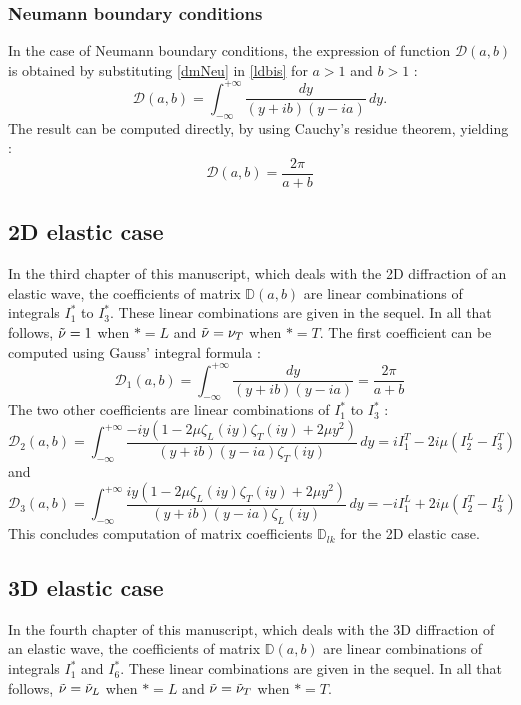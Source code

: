 \subsubsection{Neumann boundary conditions}
\label{finalDacNeu}
In the case of Neumann boundary conditions, the expression of function $\mathcal{D}(a,b)$ is obtained by substituting \eqref{dmNeu} in \eqref{ldbis} for $a>1$ and $b>1$ :
\begin{equation}
\mathcal{D}(a,b) = \int_{-\infty}^{+\infty} \dfrac{dy}{ (y+ib)(y-ia)} \, dy .
\end{equation}
The result can be computed directly, by using Cauchy's residue theorem, yielding :
\begin{equation}
\mathcal{D}(a,b)=\dfrac{2\pi}{a+b}
\end{equation}

\subsection{2D elastic case}
In the third chapter of this manuscript, which deals with the 2D diffraction of an elastic wave, the coefficients of matrix $\mathbb{D}(a,b)$ are linear combinations of integrals $I_1^*$ to $I_3^*$. These linear combinations are given in the sequel. In all that follows, $\tilde{\nu}=1$ when $*=L$ and $\tilde{\nu}=\nu_T$ when $*=T$.
\label{finalD2D}
The first coefficient can be computed using Gauss' integral formula :
\begin{equation}
\mathcal{D}_1(a,b)=\int_{-\infty}^{+\infty} \frac{dy}{(y+ib)(y-ia)}=\frac{2\pi}{a+b}
\end{equation}
The two other coefficients are linear combinations of $I_1^*$ to $I_3^*$ :
\begin{equation}
\mathcal{D}_2(a,b)=\int_{-\infty}^{+\infty} \frac{-iy(1-2\mu \zeta_L(iy) \zeta_T(iy)+2\mu y^2)}{(y+ib)(y-ia)\zeta_T(iy)} \,dy =i I_1^T-2i\mu(I_2^L-I_3^T)
\label{D2}
\end{equation}
and
\begin{equation}
\mathcal{D}_3(a,b)=\int_{-\infty}^{+\infty} \frac{iy(1-2\mu \zeta_L(iy) \zeta_T(iy)+2\mu y^2)}{(y+ib)(y-ia)\zeta_L(iy)} \,dy=-iI_1^L+2i\mu(I_2^T-I_3^L)
\label{D3}
\end{equation}
This concludes computation of matrix coefficients $\mathbb{D}_{lk}$ for the 2D elastic case.

\subsection{3D elastic case}
\label{finalD3D}
In the fourth chapter of this manuscript, which deals with the 3D diffraction of an elastic wave, the coefficients of matrix $\mathbb{D}(a,b)$ are linear combinations of integrals $I_1^*$ and $I_6^*$. These linear combinations are given in the sequel. In all that follows, $\tilde{\nu}=\tilde{\nu}_L$ when $*=L$ and $\tilde{\nu}=\tilde{\nu}_T$ when $*=T$.

